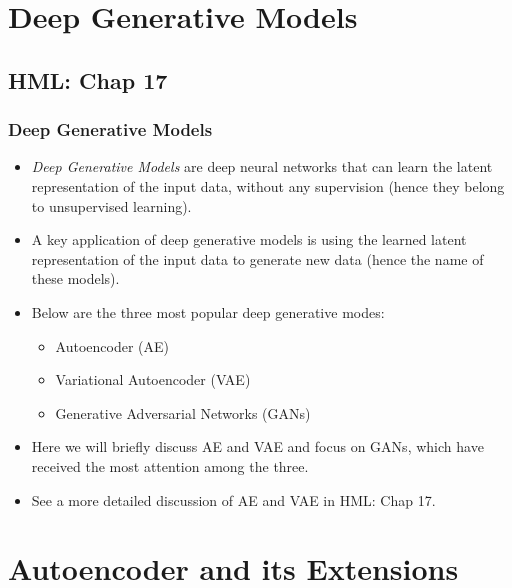 \documentclass{beamer}
\begin{document}

\section{Deep Generative Models}
\subsection{HML: Chap 17}
\begin{frame}
\setlength{\leftmargini}{0.3cm}
\setlength{\leftmarginii}{0.6cm}
\setlength{\leftmarginiii}{0.9cm}
\frametitle{Deep Generative Models}
\begin{itemize}
\item \emph{Deep Generative Models} are deep neural networks that can learn the latent representation of the input data, without any supervision (hence they belong to unsupervised learning).
\item A key application of deep generative models is using the learned latent representation of the input data to generate new data (hence the name of these models).
\item Below are the three most popular deep generative modes:
	\begin{itemize}
	\item Autoencoder (AE)
	\item Variational Autoencoder (VAE)
	\item Generative Adversarial Networks (GANs)
	\end{itemize}
\item Here we will briefly discuss AE and VAE and focus on GANs, which have received the most attention among the three.
\item See a more detailed discussion of AE and VAE in HML: Chap 17.
\end{itemize}
\end{frame}



\section{Autoencoder and its Extensions}
\end{document}
